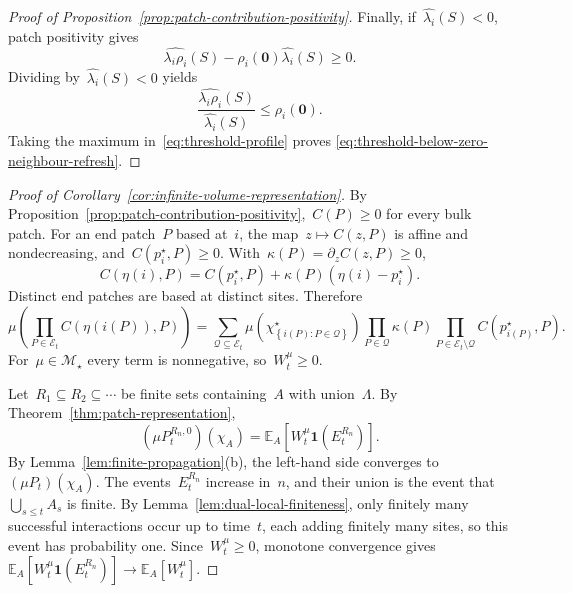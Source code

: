 \documentclass[EJP,preprint,NODS,nobera]{ejpecp}
\newcommand{\E}{\mathbb{E}}
\newcommand{\bb}[1]{\left(#1\right)}
\newcommand{\Cb}[1]{\left[#1\right]}
\newcommand{\cb}[1]{\left\{#1\right\}}
\newcommand{\ind}{\mathbf{1}}
\newcommand{\mb}[1]{\mathbf{#1}}
\newcommand{\chg}[1]{{\color{changegreen}#1}}
\begin{document}
\begin{proof}[Proof of Proposition~\ref{prop:patch-contribution-positivity}]
Finally, if~$\widehat{\lambda_i}(S)<0$, patch positivity gives
\begin{equation*}
\widehat{\lambda_i\rho_i}(S)
-
\rho_i(\mb 0)\widehat{\lambda_i}(S)
\geq0.
\end{equation*}
Dividing by~$\widehat{\lambda_i}(S)<0$ yields
\begin{equation*}
\frac{\widehat{\lambda_i\rho_i}(S)}
{\widehat{\lambda_i}(S)}
\leq
\rho_i(\mb 0).
\end{equation*}
Taking the maximum in~\eqref{eq:threshold-profile} proves
\eqref{eq:threshold-below-zero-neighbour-refresh}.
\end{proof}

\chg{\begin{proof}[Proof of Corollary~\ref{cor:infinite-volume-representation}]
By Proposition~\ref{prop:patch-contribution-positivity},~$C(P)\geq0$ for every
bulk patch. For an end patch~$P$ based at~$i$, the map~$z\mapsto C(z,P)$ is
affine and nondecreasing, and~$C(p_i^\star,P)\geq0$. With~$\kappa(P)=\partial_zC(z,P)\geq0$,
\begin{equation*}
C\bb{\eta(i),P}
=
C\bb{p_i^\star,P}
+
\kappa(P)\bb{\eta(i)-p_i^\star}.
\end{equation*}
Distinct end patches are based at distinct sites. Therefore
\begin{equation}
\label{eq:centered-end-expansion}
\mu\bb{
\prod_{P\in\mathcal E_t}
C\bb{\eta\bb{i(P)},P}
} =
\sum_{\mathcal Q\subseteq\mathcal E_t}
\mu\bb{
\chi_{\cb{i(P):P\in\mathcal Q}}^\star
}
\prod_{P\in\mathcal Q}\kappa(P)
\prod_{P\in\mathcal E_t\setminus\mathcal Q}
C\bb{p_{i(P)}^\star,P}.
\end{equation}
For~$\mu\in\mathcal M_\star$ every term is nonnegative, so~$W_t^\mu\geq0$.

Let~$R_1\subseteq R_2\subseteq\cdots$ be finite sets containing~$A$ with union~$\Lambda$.
By Theorem~\ref{thm:patch-representation},
\begin{equation*}
(\mu P_t^{R_n,0})(\chi_A)
=
\E_A\Cb{W_t^\mu\ind\bb{E_t^{R_n}}}.
\end{equation*}
By Lemma~\ref{lem:finite-propagation}(b), the left-hand side converges
to~$(\mu P_t)(\chi_A)$. The events~$E_t^{R_n}$ increase in~$n$, and their union
is the event that~$\bigcup_{s\leq t}A_s$ is finite. By
Lemma~\ref{lem:dual-local-finiteness}, only finitely many successful
interactions occur up to time~$t$, each adding finitely many sites, so this
event has probability one. Since~$W_t^\mu\geq0$, monotone convergence gives
$\E_A\Cb{W_t^\mu\ind\bb{E_t^{R_n}}}\to\E_A\Cb{W_t^\mu}$.
\end{proof}}
\end{document}
